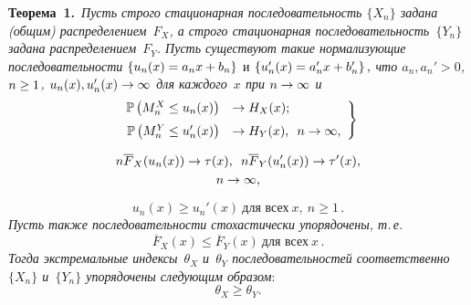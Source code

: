 \begin{multicols}{2}
\smallskip

\noindent
\textbf{Теорема~1.}\
\textit{Пусть строго стационарная последовательность  $\{ X_n \}$  
задана (общим) распределением~$F_X$, а строго стационарная последовательность~$\{ Y_n \}$  
задана  распределением~$F_Y$.
Пусть \mbox{существуют} такие нормализующие последовательности}
$\left\{u_n(x)\hm=a_n x\hm+ b_n\right\}$ и $\left\{u_n'(x)\hm=a_n'x\hm+b_n'\right\},$
\textit{что $a_n, a_n' >0$,  $n\hm\ge 1$, $u_n(x), u_n'(x) \hm\to \infty$  для каж\-до\-го~$x$ 
при $n\hm\to\infty$ и}
\begin{equation}
\left.
\begin{array}{rl}
       \mathbb{P}\left(M_n^X \le u_n(x)\right)  &\to  H_X(x); \\[6pt]
        \mathbb{P}\left(M_n^Y \le u_n'(x)\right) &\to H_Y(x), \enskip  n\to\infty,
       \end{array}
       \right\}
\label{teor2-1}
\end{equation}

\vspace*{-12pt}

\noindent
\begin{multline}
n\overline F_X(u_n(x)) \to \tau(x),\enskip n\overline F_Y(u_n'(x)) \to \tau'(x), 
\\  n\to \infty,
\label{teor2-2}
\end{multline}

\noindent
\begin{equation}
u_n(x)\ge u_n'(x) \ \mbox{для всех} \  x, \ n\ge 1\,. 
\label{teor2}
\end{equation}
\textit{Пусть также  последовательности стохастически упорядочены,
т.\,е.}
\begin{equation}
\overline F_X(x) \le \overline F_Y(x)\ \mbox{для всех} \  x\,.
 \label{teor3}
\end{equation}
\textit{Тогда   экстремальные индексы~$\theta_X$ и~$\theta_Y$  последовательностей 
соответственно~$\{ X_n \} $ и~$\{ Y_n \}$ упорядочены сле\-ду\-ющим образом}:
\begin{equation}
    \label{theta_comp}
    \theta_X\ge \theta_Y.
\end{equation}



\end{multicols}
